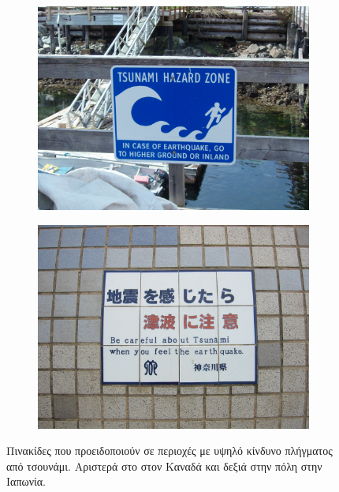\begin{figure}[h]
  \begin{subfigure}{.5\textwidth}
    \centering
    \includegraphics[width=\textwidth]{figures/tsunami-sign-0.jpg}
  \end{subfigure}
  \begin{subfigure}{.5\textwidth}
    \centering
    \includegraphics[width=\textwidth]{figures/tsunami-sign-1.jpg}
  \end{subfigure}
  \caption[Προειδοποιητικές πινακίδες σε περιοχές υψηλού κινδύνου]{Πινακίδες που
    προειδοποιούν σε περιοχές με υψηλό κίνδυνο πλήγματος από τσουνάμι. Αριστερά στο
     στον Καναδά και δεξιά στην πόλη  στην
    Ιαπωνία.}
  \label{fig:tsunami-signs}
\end{figure}

